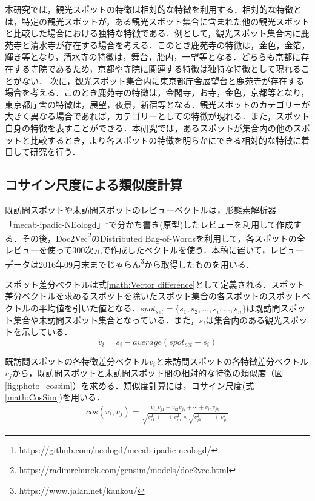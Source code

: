 \documentclass{deimj}
\begin{document}
本研究では，観光スポットの特徴は相対的な特徴を利用する．相対的な特徴とは，特定の観光スポットが，ある観光スポット集合に含まれた他の観光スポットと比較した場合における独特な特徴である．例として，観光スポット集合内に鹿苑寺と清水寺が存在する場合を考える．このとき鹿苑寺の特徴は，金色，金箔，輝き等となり，清水寺の特徴は，舞台，胎内，一望等となる．どちらも京都に存在する寺院であるため，京都や寺院に関連する特徴は独特な特徴として現れることがない．
次に，観光スポット集合内に東京都庁舎展望台と鹿苑寺が存在する場合を考える．このとき鹿苑寺の特徴は，金閣寺，お寺，金色，京都等となり，東京都庁舎の特徴は，展望，夜景，新宿等となる．観光スポットのカテゴリーが大きく異なる場合であれば，カテゴリーとしての特徴が現れる．また，スポット自身の特徴を表すことができる．本研究では，あるスポットが集合内の他のスポットと比較するとき，より各スポットの特徴を明らかにできる相対的な特徴に着目して研究を行う．

\subsection{コサイン尺度による類似度計算}
\label{subsec:Calculation of similarity by cosine similarity}
既訪問スポットや未訪問スポットのレビューベクトルは，形態素解析器「mecab-ipadic-NEologd」\footnote{https://github.com/neologd/mecab-ipadic-neologd/}で分かち書き(原型)したレビューを利用して作成する．その後，Doc2Vec\footnote{https://radimrehurek.com/gensim/models/doc2vec.html}のDistributed Bag-of-Wordsを利用して，各スポットの全レビューを使って300次元で作成したベクトルを使う．本稿に置いて，レビューデータは2016年09月末までじゃらん\footnote{https://www.jalan.net/kankou/}から取得したものを用いる．

スポット差分ベクトルは式\ref{math:Vector difference}として定義される．スポット差分ベクトルを求めるスポットを除いたスポット集合の各スポットのスポットベクトルの平均値を引いた値となる．$spot_{set} =\{s_1,s_2,\dots,s_i,\dots,s_n\}$は既訪問スポット集合や未訪問スポット集合となっている．また，$s_i$は集合内のある観光スポットを示している．
\begin{equation}
  v_i=s_i-average(spot_{set}-s_i)
    \label{math:Vector difference}
\end{equation}

既訪問スポットの各特徴差分ベクトル$v_i$と未訪問スポットの各特徴差分ベクトル$v_j$から，既訪問スポットと未訪問スポット間の相対的な特徴の類似度（図\ref{fig:photo_cossim}）を求める．類似度計算には，コサイン尺度(式\ref{math:CosSim})を用いる．
\begin{eqnarray}
cos(v_i,v_j)=\frac{v_{i1}v_{j1}+v_{i2}v_{j2}+\cdots+v_{in}v_{jn}}
{\sqrt{v^2_{i1}+\cdots+v^2_{in}}\times\sqrt{v^2_{j1}+\cdots+v^2_{jn}}}
\label{math:CosSim}
\end{eqnarray}
\end{document}
